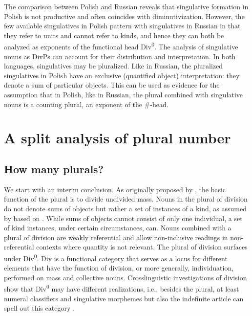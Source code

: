 \documentclass[output=paper,colorlinks,citecolor=brown]{langscibook}
\begin{document}
\noindent The comparison between Polish and Russian reveals that singulative formation in Polish is not productive and often coincides with diminutivization. However, the few available singulatives in Polish pattern with singulatives in Russian in that they refer to units and cannot refer to kinds, and hence they can both be analyzed as exponents of the functional head Div\textsuperscript{0}. The analysis of singulative nouns as DivPs can account for their distribution and interpretation. In both languages, singulatives may be pluralized. Like in Russian, the pluralized singulatives in Polish have an exclusive (quantified object) interpretation: they denote a sum of particular objects. This can be used as evidence for the assumption that in Polish, like in Russian, the plural combined with singulative nouns is a counting plural, an exponent of the \#-head. 


\section{A split analysis of plural number}\label{sec:geist:4}
\largerpage
\subsection{How many plurals?}\label{sec:geist:4.1}

We start with an interim conclusion. As originally proposed by \citet{Borer2005}, the basic function of the plural is to divide undivided mass. Nouns in the plural of division do not denote sums of objects but rather a set of instances of a kind, as assumed by \citet{Mathieu2012} based on \citet{Grimm2013}. While sums of objects cannot consist of only one individual, a set of kind instances, under certain circumstances, can. Nouns combined with a plural of division are weakly referential and allow non-inclusive readings in non-referential contexts where quantity is not relevant. The plural of division surfaces under Div\textsuperscript{0}. Div is a functional category that serves as a locus for different elements that have the function of division, or more generally, individuation, performed on mass and collective nouns. Crosslinguistic investigations of division show that Div\textsuperscript{0} may have different realizations, i.e., besides the plural, at least numeral classifiers and singulative morphemes but also the indefinite article can spell out this category \citep{Mathieu2012,Mathieu2014}. 
\end{document}
